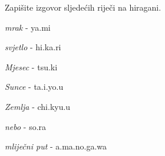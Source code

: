 	\begin{mondai}{Zapišite izgovor sljedećih riječi na hiragani.}
		\item \textit{mrak} - ya.mi
		\item \textit{svjetlo} - hi.ka.ri
		\item \textit{Mjesec} - tsu.ki
		\item \textit{Sunce} - ta.i.yo.u
		\item \textit{Zemlja} - chi.kyu.u
		\item \textit{nebo} - so.ra
		\item \textit{mliječni put} - a.ma.no.ga.wa
	\end{mondai}

